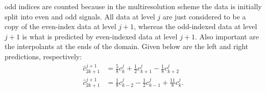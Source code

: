 \documentclass{article}
\begin{document}
odd indices are counted because in the multiresolution scheme the
data is initially split into even
and odd signals. All data at level $j$ are just considered to
be a copy of the even-index data at level $j+1$, whereas
the odd-indexed data at level $j+1$ is what is predicted
by even-indexed data at level $j+1$. Also important are the
interpolants at the ends of the domain. Given below are the
left and right predictions, respectively:
\begin{align}
	\hat{c}^{j+1}_{2k+1} & = \frac{5}{8} c^{j}_{k}
	+ \frac{1}{2} c^{j}_{k+1} - \frac{1}{8} c^{j}_{k+2} \\
	\hat{c}^{j+1}_{2k+1} & = \frac{1}{8} c^{j}_{k-2}
	- \frac{1}{2} c^{j}_{k-1} + \frac{11}{8} c^{j}_{k}.
\end{align}

  

\end{document}
